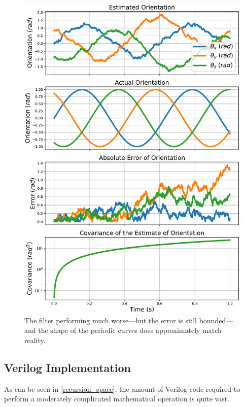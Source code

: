 \documentclass[12pt]{article}
\begin{document}
\begin{figure}[thp]
	\centering
	
	\includegraphics[width=\textwidth]{3d-orientation-noisy.pdf}
	
	\caption{The filter performing much worse---but the error is still bounded---and the shape of the periodic curves does approximately match reality.}
	\label{3d_noise_fig}
\end{figure}

\subsection{Verilog Implementation}

As can be seen in \ref{recursion_space}, the amount of Verilog code required to perform a moderately complicated mathematical operation is quite vast.
\end{document}

